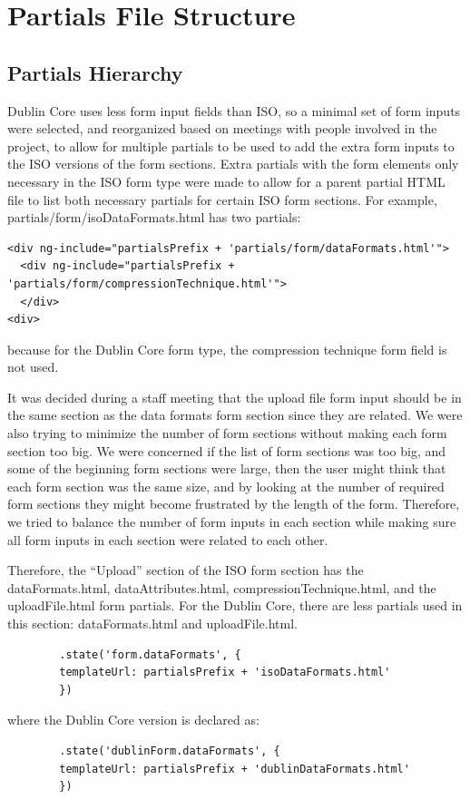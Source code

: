 \documentclass[a4paper, 12pt]{article}
\begin{document}
\section{Partials File Structure}
\subsection{Partials Hierarchy}
\par\indent
Dublin Core uses less form input fields than ISO, so a minimal set of form inputs were selected, and reorganized based on meetings with people involved in the project, to allow for multiple partials to be used to add the extra form inputs to the ISO versions of the form sections. Extra partials with the form elements only necessary in the ISO form type were made to allow for a parent partial HTML file to list both necessary partials for certain ISO form sections. For example, partials/form/isoDataFormats.html has two partials: 
\begin{lstlisting}
<div ng-include="partialsPrefix + 'partials/form/dataFormats.html'">
  <div ng-include="partialsPrefix + 'partials/form/compressionTechnique.html'">
  </div>
<div>
\end{lstlisting}
because for the Dublin Core form type, the compression technique form field is not used.
\par\indent
It was decided during a staff meeting that the upload file form input should be in the same section as the data formats form section since they are related. We were also trying to minimize the number of form sections without making each form section too big. We were concerned if the list of form sections was too big, and some of the beginning form sections were large, then the user might think that each form section was the same size, and by looking at the number of required form sections they might become frustrated by the length of the form. Therefore, we tried to balance the number of form inputs in each section while making sure all form inputs in each section were related to each other.

\par\indent
Therefore, the ``Upload'' section of the ISO form section has the dataFormats.html, dataAttributes.html, compressionTechnique.html, and the uploadFile.html form partials. For the Dublin Core, there are less partials used in this section: dataFormats.html and uploadFile.html.

\begin{lstlisting}
  	    .state('form.dataFormats', {
		templateUrl: partialsPrefix + 'isoDataFormats.html'
	    })
\end{lstlisting}
where the Dublin Core version is declared as:
\begin{lstlisting}
	    .state('dublinForm.dataFormats', {
		templateUrl: partialsPrefix + 'dublinDataFormats.html'
	    })
\end{lstlisting}
\end{document}
